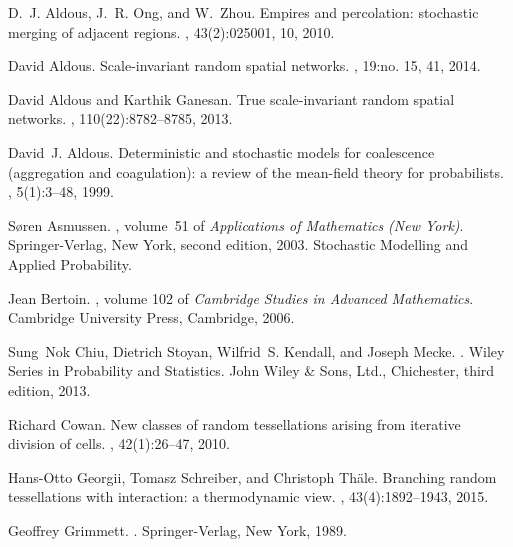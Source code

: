 \documentclass[12pt]{article}
\begin{document}
 
 \begin{thebibliography}{10}

D.~J. Aldous, J.~R. Ong, and W.~Zhou.
\newblock Empires and percolation: stochastic merging of adjacent regions.
, 43(2):025001, 10, 2010.

David Aldous.
\newblock Scale-invariant random spatial networks.
, 19:no. 15, 41, 2014.

David Aldous and Karthik Ganesan.
\newblock True scale-invariant random spatial networks.
, 110(22):8782--8785, 2013.

David~J. Aldous.
\newblock Deterministic and stochastic models for coalescence (aggregation and
  coagulation): a review of the mean-field theory for probabilists.
, 5(1):3--48, 1999.

S{\o}ren Asmussen.
, volume~51 of {\em Applications
  of Mathematics (New York)}.
\newblock Springer-Verlag, New York, second edition, 2003.
\newblock Stochastic Modelling and Applied Probability.

Jean Bertoin.
, volume 102 of
  {\em Cambridge Studies in Advanced Mathematics}.
\newblock Cambridge University Press, Cambridge, 2006.

Sung~Nok Chiu, Dietrich Stoyan, Wilfrid~S. Kendall, and Joseph Mecke.
.
\newblock Wiley Series in Probability and Statistics. John Wiley \& Sons, Ltd.,
  Chichester, third edition, 2013.

Richard Cowan.
\newblock New classes of random tessellations arising from iterative division
  of cells.
, 42(1):26--47, 2010.

Hans-Otto Georgii, Tomasz Schreiber, and Christoph Th{\"a}le.
\newblock Branching random tessellations with interaction: a thermodynamic
  view.
, 43(4):1892--1943, 2015.

Geoffrey Grimmett.
.
\newblock Springer-Verlag, New York, 1989.


\end{thebibliography}
\end{document}
